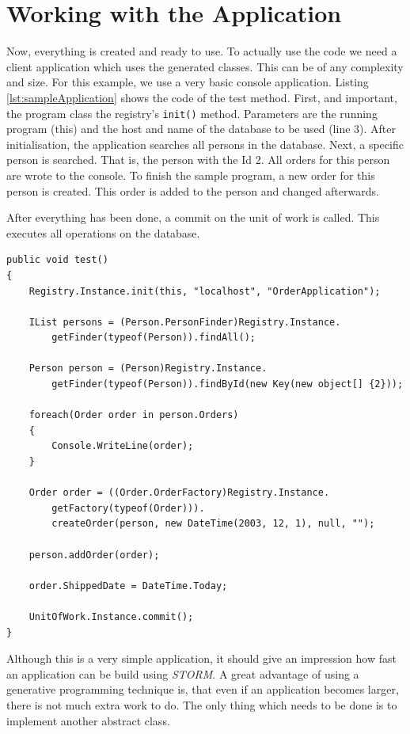 	\section{Working with the Application}
		Now, everything is created and ready to use. To actually use the code we need a
		client application which uses the generated classes. This can be of any
		complexity and size. For this example, we use a very basic console
		application. Listing \ref{lst:sampleApplication} shows the code of the test method.
		First, and important, the program class the registry's \verb~init()~ method.
		Parameters are the running program (this) and the host and name of the
		database to be used (line 3).
		After initialisation, the application searches all persons in the database.
		Next, a specific person is searched. That is, the person with the Id 2. All
		orders for this person are wrote to the console. To finish the sample
		program, a new order for this person is created. This order is added to 
		the person and changed afterwards.
		
		After everything has been done, a commit on the unit of work is called.
		This executes all operations on the database.
		
		\begin{lstlisting}[language={[Sharp]C},caption=Sample console application,
		label=lst:sampleApplication]
public void test()
{
	Registry.Instance.init(this, "localhost", "OrderApplication");

	IList persons = (Person.PersonFinder)Registry.Instance.
		getFinder(typeof(Person)).findAll();

	Person person = (Person)Registry.Instance.
		getFinder(typeof(Person)).findById(new Key(new object[] {2}));
	
	foreach(Order order in person.Orders)
	{
		Console.WriteLine(order);
	}

	Order order = ((Order.OrderFactory)Registry.Instance.
		getFactory(typeof(Order))).
		createOrder(person, new DateTime(2003, 12, 1), null, "");
		
	person.addOrder(order);

	order.ShippedDate = DateTime.Today;
	
	UnitOfWork.Instance.commit();
}
		\end{lstlisting}
		
		Although this is a very simple application, it should give an impression how
		fast an application can be build using \textit{STORM}. A great advantage
		of using a generative programming technique is, that even if an application
		becomes larger, there is not much extra work to do. The only thing which 
		needs to be done is to implement another abstract class.
		